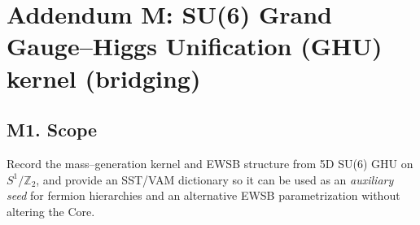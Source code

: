 \documentclass[11pt]{article}
\begin{document}
  \titlepageOpen

  \begin{abstract}


  \end{abstract}

  \titlepageClose
  \fi

  \ifdefined\standalonechapter
  \section{\papertitle}
  \else
  \fi



  \section*{Addendum M: SU(6) Grand Gauge–Higgs Unification (GHU) kernel (bridging)}

      \subsection*{M1. Scope}
          Record the mass–generation kernel and EWSB structure from 5D SU(6) GHU on $S^1/\mathbb Z_2$, and provide an SST/VAM dictionary so it can be used as an \emph{auxiliary seed} for fermion hierarchies and an alternative EWSB parametrization without altering the Core.
\end{document}
